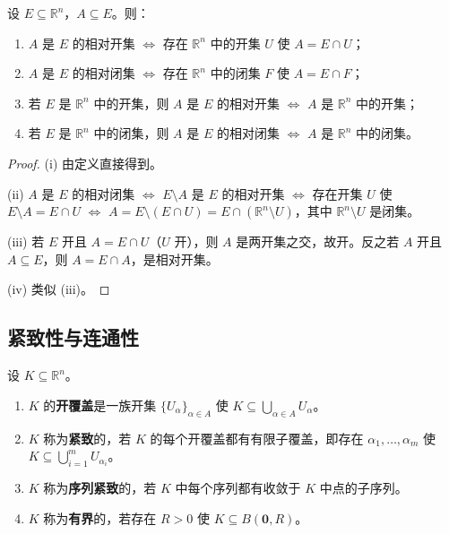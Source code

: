 \begin{proposition}[相对开集与相对闭集的刻画]\label{prop:relative_open_closed}
设 $E \subseteq \mathbb{R}^n$，$A \subseteq E$。则：
\begin{enumerate}[label=(\roman*)]
    \item $A$ 是 $E$ 的相对开集 $\iff$ 存在 $\mathbb{R}^n$ 中的开集 $U$ 使 $A = E \cap U$；
    \item $A$ 是 $E$ 的相对闭集 $\iff$ 存在 $\mathbb{R}^n$ 中的闭集 $F$ 使 $A = E \cap F$；
    \item 若 $E$ 是 $\mathbb{R}^n$ 中的开集，则 $A$ 是 $E$ 的相对开集 $\iff$ $A$ 是 $\mathbb{R}^n$ 中的开集；
    \item 若 $E$ 是 $\mathbb{R}^n$ 中的闭集，则 $A$ 是 $E$ 的相对闭集 $\iff$ $A$ 是 $\mathbb{R}^n$ 中的闭集。
\end{enumerate}
\end{proposition}

\begin{proof}
(i) 由定义直接得到。

(ii) $A$ 是 $E$ 的相对闭集 $\iff$ $E \setminus A$ 是 $E$ 的相对开集 $\iff$ 存在开集 $U$ 使 $E \setminus A = E \cap U$ $\iff$ $A = E \setminus (E \cap U) = E \cap (\mathbb{R}^n \setminus U)$，其中 $\mathbb{R}^n \setminus U$ 是闭集。

(iii) 若 $E$ 开且 $A = E \cap U$（$U$ 开），则 $A$ 是两开集之交，故开。反之若 $A$ 开且 $A \subseteq E$，则 $A = E \cap A$，是相对开集。

(iv) 类似 (iii)。
\end{proof}

\subsection{紧致性与连通性}

\begin{definition}[开覆盖与紧致性]\label{def:compactness}
设 $K \subseteq \mathbb{R}^n$。
\begin{enumerate}[label=(\roman*)]
    \item $K$ 的\textbf{开覆盖}是一族开集 $\{U_\alpha\}_{\alpha \in A}$ 使 $K \subseteq \bigcup_{\alpha \in A} U_\alpha$。
    \item $K$ 称为\textbf{紧致}的，若 $K$ 的每个开覆盖都有有限子覆盖，即存在 $\alpha_1, \dots, \alpha_m$ 使 $K \subseteq \bigcup_{i=1}^{m} U_{\alpha_i}$。
    \item $K$ 称为\textbf{序列紧致}的，若 $K$ 中每个序列都有收敛于 $K$ 中点的子序列。
    \item $K$ 称为\textbf{有界}的，若存在 $R > 0$ 使 $K \subseteq B(\mathbf{0}, R)$。
\end{enumerate}
\end{definition}

